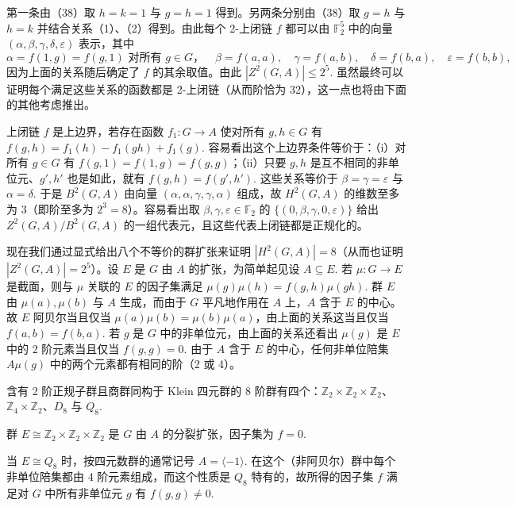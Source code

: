 第一条由（38）取 \(h = k = 1\) 与 \(g = h = 1\) 得到。另两条分别由（38）取 \(g = h\) 与 \(h = k\) 并结合关系（1）、（2）得到。由此每个 2-上闭链 \(f\) 都可以由 \(\mathbb{F}_2^5\) 中的向量 \((\alpha, \beta, \gamma, \delta, \varepsilon)\) 表示，其中
\[
\alpha = f(1,g) = f(g,1) \text{ 对所有 } g \in G，\quad \beta = f(a,a),\quad \gamma = f(a,b),\quad \delta = f(b,a),\quad \varepsilon = f(b,b),
\]
因为上面的关系随后确定了 \(f\) 的其余取值。由此 \(|Z^2(G, A)| \leq 2^5\). 虽然最终可以证明每个满足这些关系的函数都是 2-上闭链（从而阶恰为 32），这一点也将由下面的其他考虑推出。

上闭链 \(f\) 是上边界，若存在函数 \(f_1 : G \to A\) 使对所有 \(g, h \in G\) 有 \(f(g,h) = f_1(h)-f_1(gh)+f_1(g)\). 容易看出这个上边界条件等价于：（i）对所有 \(g \in G\) 有 \(f(g,1) = f(1,g) = f(g,g)\)；（ii）只要 \(g, h\) 是互不相同的非单位元、\(g', h'\) 也是如此，就有 \(f(g,h) = f(g',h')\). 这些关系等价于 \(\beta = \gamma = \varepsilon\) 与 \(\alpha = \delta\). 于是 \(B^2(G, A)\) 由向量 \((\alpha, \alpha, \gamma, \gamma, \alpha)\) 组成，故 \(H^2(G, A)\) 的维数至多为 3（即阶至多为 \(2^3 = 8\)）。容易看出取 \(\beta, \gamma, \varepsilon \in \mathbb{F}_2\) 的 \(\{(0, \beta, \gamma, 0, \varepsilon)\}\) 给出 \(Z^2(G, A)/B^2(G, A)\) 的一组代表元，且这些代表上闭链都是正规化的。

现在我们通过显式给出八个不等价的群扩张来证明 \(|H^2(G, A)| = 8\)（从而也证明 \(|Z^2(G, A)| = 2^5\)）。设 \(E\) 是 \(G\) 由 \(A\) 的扩张，为简单起见设 \(A \subseteq E\). 若 \(\mu : G \to E\) 是截面，则与 \(\mu\) 关联的 \(E\) 的因子集满足 \(\mu(g)\mu(h) = f(g,h)\mu(gh)\). 群 \(E\) 由 \(\mu(a), \mu(b)\) 与 \(A\) 生成，而由于 \(G\) 平凡地作用在 \(A\) 上，\(A\) 含于 \(E\) 的中心。故 \(E\) 阿贝尔当且仅当 \(\mu(a)\mu(b) = \mu(b)\mu(a)\)，由上面的关系这当且仅当 \(f(a,b) = f(b,a)\). 若 \(g\) 是 \(G\) 中的非单位元，由上面的关系还看出 \(\mu(g)\) 是 \(E\) 中的 2 阶元素当且仅当 \(f(g,g) = 0\). 由于 \(A\) 含于 \(E\) 的中心，任何非单位陪集 \(A\mu(g)\) 中的两个元素都有相同的阶（2 或 4）。

含有 2 阶正规子群且商群同构于 Klein 四元群的 8 阶群有四个：\(\mathbb{Z}_2 \times \mathbb{Z}_2 \times \mathbb{Z}_2\)、\(\mathbb{Z}_4 \times \mathbb{Z}_2\)、\(D_8\) 与 \(Q_8\).

群 \(E \cong \mathbb{Z}_2 \times \mathbb{Z}_2 \times \mathbb{Z}_2\) 是 \(G\) 由 \(A\) 的分裂扩张，因子集为 \(f = 0\).

当 \(E \cong Q_8\) 时，按四元数群的通常记号 \(A = \langle-1\rangle\). 在这个（非阿贝尔）群中每个非单位陪集都由 4 阶元素组成，而这个性质是 \(Q_8\) 特有的，故所得的因子集 \(f\) 满足对 \(G\) 中所有非单位元 \(g\) 有 \(f(g,g) \neq 0\).

